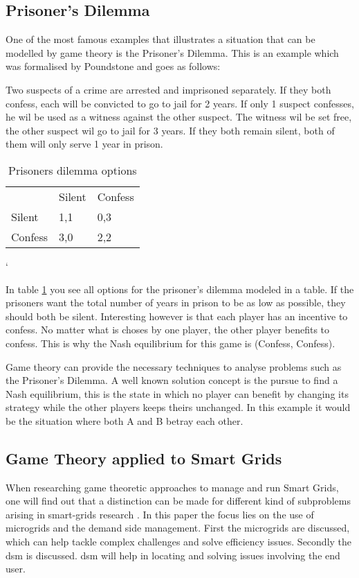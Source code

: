 \subsection{Prisoner's Dilemma}
One of the most famous examples that illustrates a situation that can be modelled by game theory is the Prisoner's Dilemma. This is an example which was formalised by Poundstone \cite{poundstone} and goes as follows: 

Two suspects of a crime are arrested and imprisoned separately. If they both confess, each will be convicted to go to jail for 2 years. If only 1 suspect confesses, he wil be used as a witness against the other suspect. The witness wil be set free, the other suspect wil go to jail for 3 years. If they both remain silent, both of them will only serve 1 year in prison.

\begin{table}[h]
\centering
\label{prisoners-d}
\begin{tabular}{lll}
 & Silent & Confess \\ \cline{2-3} 
\multicolumn{1}{l|}{Silent} & \multicolumn{1}{l|}{1,1} & \multicolumn{1}{l|}{0,3} \\ \cline{2-3} 
\multicolumn{1}{l|}{Confess} & \multicolumn{1}{l|}{3,0} & \multicolumn{1}{l|}{2,2} \\ \cline{2-3} 
\end{tabular}
\caption{Prisoners dilemma options}
\end{table}`

In table \ref{prisoners-d} you see all options for the prisoner's dilemma modeled in a table. If the prisoners want the total number of years in prison to be as low as possible, they should both be silent. Interesting however is that each player has an incentive to confess. No matter what is choses by one player, the other player benefits to confess. This is why the Nash equilibrium for this game is (Confess, Confess).    

Game theory can provide the necessary techniques to analyse problems such as the Prisoner's Dilemma. A well known solution concept is the pursue to find a Nash equilibrium, this is the state in which no player can benefit by changing its strategy while the other players keeps theirs unchanged. In this example it would be the situation where both A and B betray each other.




\subsection{Game Theory applied to Smart Grids}
When researching game theoretic approaches to manage and run Smart Grids, one will find out that a distinction can be made for different kind of subproblems arising in smart-grids research \cite{keypaper}. In this paper the focus lies on the use of microgrids and the demand side management. First the microgrids are discussed, which can help tackle complex challenges and solve efficiency issues. Secondly the \gls{dsm} is discussed. \gls{dsm} will help in locating and solving issues involving the end user. 

